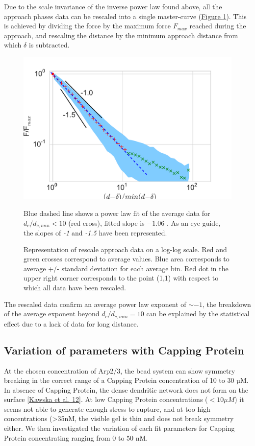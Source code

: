 \documentclass[A4paperpaper,11pt,english]{sphinxmanual}
\begin{document}
Due to the scale invariance of the inverse power law found above,  all the
approach phases data can be rescaled into a single master-curve (\hyperref[index-latex:fig-rescale-powerlaw]{Figure  \ref*{index-latex:fig-rescale-powerlaw}}). This is achieved
by dividing the force by the maximum force \(F_{max}\) reached during the
approach, and rescaling the distance by the minimum approach distance from which
\(\delta\) is subtracted.
\begin{figure}[htbp]
\centering
\capstart

\includegraphics[width=0.700\linewidth]{rescaled_powerlaw.pdf}
\caption{Representation of rescale approach data on a log-log scale.  Red and green
crosses correspond to average values. Blue area corresponds to average +/-
standard deviation for each average bin. Red dot in the upper right corner
corresponds to the point (1,1) with respect to which all data have been
rescaled.}{\small 
Blue dashed line shows a power law fit of the average data for
\(d_c/d_{c,min} < 10\) (red cross), fitted slope is \(-1.06\) .
As an eye guide, the slopes of \emph{-1} and \emph{-1.5} have been represented.
}\label{index-latex:fig-rescale-powerlaw}\end{figure}

The rescaled data confirm an average power law exponent of \(\sim -1\), the
breakdown of the average exponent beyond \(d_c/d_{c,min}=10\) can be
explained by the statistical effect due to a lack of data for long distance.


\subsection{Variation of parameters with Capping Protein}
\label{index-latex:variation-of-parameters-with-capping-protein}
At the chosen concentration of Arp2/3, the bead system can show symmetry
breaking in the correct range of a Capping Protein concentration of 10 to 30
µM. In absence of Capping Protein, the dense dendritic network does not form on
the surface {\hyperref[index-latex:kawska2012]{{[}Kawska et al. 12{]}}}. At low Capping Protein concentrations (\(<10 \mu{}M\)) it seems not able to generate enough stress to
rupture, and at too high concentrations (\textgreater{}35nM, the visible gel is thin and does
not break symmetry either. We then investigated the variation of each fit parameters for Capping Protein concentrating ranging from 0 to 50 nM.
\end{document}
